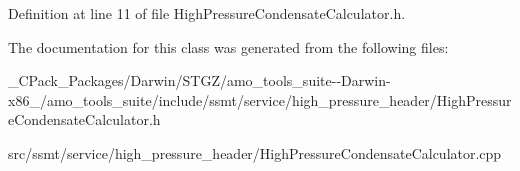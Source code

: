 Definition at line 11 of file High\+Pressure\+Condensate\+Calculator.\+h.



The documentation for this class was generated from the following files\+:\begin{DoxyCompactItemize}
\item 
\+\_\+\+C\+Pack\+\_\+\+Packages/\+Darwin/\+S\+T\+G\+Z/amo\+\_\+tools\+\_\+suite-\/-\/\+Darwin-\/x86\+\_/amo\+\_\+tools\+\_\+suite/include/ssmt/service/high\+\_\+pressure\+\_\+header/High\+Pressure\+Condensate\+Calculator.\+h\item 
src/ssmt/service/high\+\_\+pressure\+\_\+header/High\+Pressure\+Condensate\+Calculator.\+cpp\end{DoxyCompactItemize}
